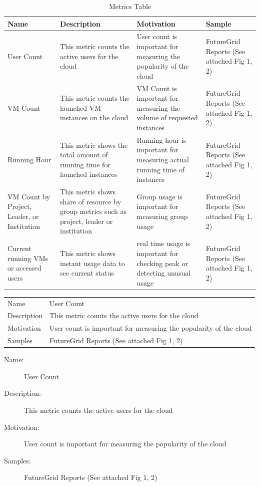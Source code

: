\documentclass{sig-alternate-05-2015}
\begin{document}
\begin{table}[htb]

\caption{Metrics Table}
\label{T:metrics}
\bigskip
\begin{tabular}{p{}p{}p{}p{}}
Name & Description & Motivation & Sample \\
\hline
User Count & 
This metric counts the active users for the cloud &
User count is important for measuring the popularity of the cloud & 
FutureGrid Reports (See attached Fig 1, 2) \\
\hline
VM Count & 
This metric counts the launched VM instances on the cloud &
VM Count is important for measuring the volume of requested instances &
FutureGrid Reports (See attached Fig 1, 2) \\
\hline
Running Hour &
This metric shows the total amount of running time for launched instances &
Running hour is important for measuring actual running time of instances &
FutureGrid Reports (See attached Fig 1, 2) \\
\hline
VM Count by Project, Leader, or Institution &
This metric shows share of resource by group metrics such as project, leader or institution &
Group usage is important for measuring group usage &
FutureGrid Reports (See attached Fig 1, 2) \\
\hline
Current running VMs or accessed users &
This metric shows instant usage data to see current status &
real time usage is important for checking peak or detecting unusual usage &
FutureGrid Reports (See attached Fig 1, 2) \\
\hline
\end{tabular}

\end{table}



\flushleft
\begin{tabular}{p{}p{}}
{\bf\it\small} Name &  User Count \\
{\bf\it\small} Description & This metric counts the active users for the cloud \\
{\bf\it\small} Motivation & User count is important for measuring the popularity of the cloud\\
{\bf\it\small} Samples & FutureGrid Reports (See attached Fig 1, 2) \\
\end{tabular}


\begin{description}
\item[Name:] User Count
\item[Description:] This metric counts the active users for the cloud
\item[Motivation:] User count is important for measuring the popularity of the cloud
\item[Samples:] FutureGrid Reports (See attached Fig 1, 2)
\end{description}
  
\end{document}
